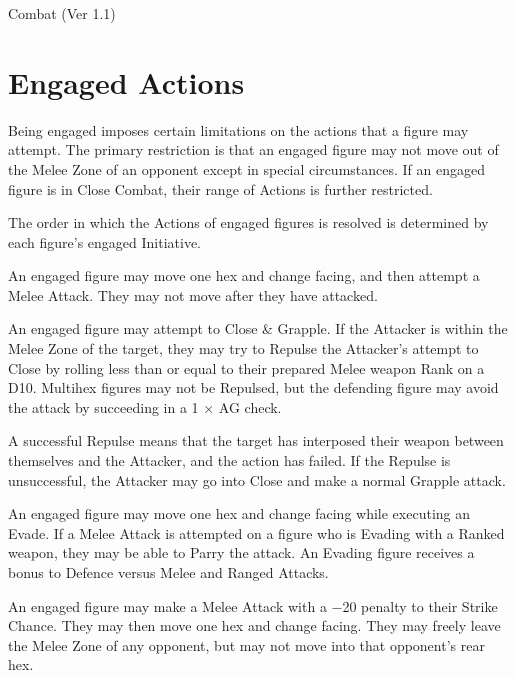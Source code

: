 \begin{Chapter}{Combat (Ver 1.1)}
\begin{Description}
\end{Description}

\section{Engaged Actions}
\label{combat:engaged}

Being engaged imposes certain limitations on the actions that a figure
may attempt.  The primary restriction is that an engaged figure may
not move out of the Melee Zone of an opponent except in special
circumstances.  If an engaged figure is in Close Combat, their range
of Actions is further restricted.

The order in which the Actions of engaged figures is resolved is
determined by each figure’s engaged Initiative.

\begin{Description}

\item[Melee Attack] An engaged figure may move one hex and change
  facing, and then attempt a Melee Attack. They may not move after
  they have attacked.

\item[Close \& Grapple] An engaged figure may attempt to Close \&
  Grapple. If the Attacker is within the Melee Zone of the target,
  they may try to Repulse the Attacker’s attempt to Close by rolling
  less than or equal to their prepared Melee weapon Rank on a D10.
  Multihex figures may not be Repulsed, but the defending figure may
  avoid the attack by succeeding in a 1 × AG check.

  A successful Repulse means that the target has interposed their
  weapon between themselves and the Attacker, and the action has
  failed.  If the Repulse is unsuccessful, the Attacker may go into
  Close and make a normal Grapple attack.

\item[Evade] An engaged figure may move one hex and change facing
  while executing an Evade. If a Melee Attack is attempted on a figure
  who is Evading with a Ranked weapon, they may be able to Parry the
  attack.  An Evading figure receives a bonus to Defence versus Melee
  and Ranged Attacks.

\item[Offensive Withdraw] An engaged figure may make a Melee Attack
  with a −20 penalty to their Strike Chance.  They may then move one
  hex and change facing.  They may freely leave the Melee Zone of any
  opponent, but may not move into that opponent’s rear hex.


\end{Description}
\end{Chapter}
